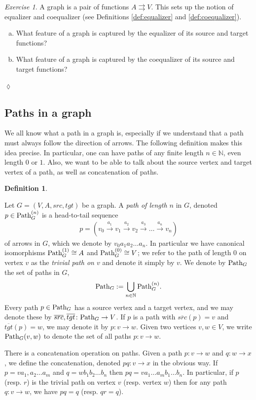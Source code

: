 \documentclass{book}
\def\tn{\textnormal}
\def\NN{{\mathbb N}}
\def\Path{\tn{Path}}
\def\to{\rightarrow}
\def\taking{\colon}
\def\tto{\rightrightarrows}
\def\iso{\cong}
\def\ol{\overline}
\newcommand{\To}[1]{\xrightarrow{#1}}
\theoremstyle{remark}
\newtheorem{exc}[subsubsection]{Exercise}
\newenvironment{exercise}{\begin{exc}}{\hspace*{\fill}$\lozenge$\end{exc}}
\theoremstyle{definition}
\newtheorem{definition}[subsubsection]{Definition}
\def\sexc{\begin{enumerate}[a.)]\setlength{\itemsep}{.1cm}\setlength{\parskip}{.1cm}\item}
\def\next{\item}
\def\endsexc{\end{enumerate}}
\begin{document}
\begin{exercise}\label{exc:(co)equalizer of graph}
A graph is a pair of functions $A\tto V$. This sets up the notion of equalizer and coequalizer (see Definitions \ref{def:equalizer} and \ref{def:coequalizer}). 
\sexc What feature of a graph is captured by the equalizer of its source and target functions? 
\next What feature of a graph is captured by the coequalizer of its source and target functions?
\endsexc
\end{exercise}


\subsection{Paths in a graph}\label{sec:paths in graph}

We all know what a path in a graph is, especially if we understand that a path must always follow the direction of arrows. The following definition makes this idea precise. In particular, one can have paths of any finite length $n\in\NN$, even length $0$ or $1$. Also, we want to be able to talk about the source vertex and target vertex of a path, as well as concatenation of paths.

\begin{definition}\label{def:paths in graph}

Let $G=(V,A,src,tgt)$ be a graph. A {\em path of length $n$} in $G$, denoted $p\in\Path_G^{(n)}$\index{a symbol!$\Path$} is a head-to-tail sequence \begin{align}\label{dia:path}p=(v_0\To{a_1}v_1\To{a_2}v_2\To{a_3}\ldots\To{a_n}v_n)\end{align} of arrows in $G$, which we denote by $v_0 a_1 a_2 \ldots a_n$. In particular we have canonical isomorphisms $\Path_G^{(1)}\iso A$ and $\Path_G^{(0)}\iso V$; we refer to the path of length 0 on vertex $v$ as the {\em trivial path on $v$} and denote it simply by $v$. We denote by $\Path_G$ the set of paths in $G$, $$\Path_G:=\bigcup_{n\in\NN}\Path_G^{(n)}.$$ Every path $p\in\Path_G$ has a source vertex and a target vertex, and we may denote these by $\ol{src},\ol{tgt}\taking\Path_G\to V$. If $p$ is a path with $\ol{src}(p)=v$ and $\ol{tgt}(p)=w$, we may denote it by $p\taking v\to w$. Given two vertices $v,w\in V$, we write $\Path_G(v,w)$ to denote the set of all paths $p\taking v\to w$.

There is a concatenation operation on paths. Given a path $p\taking v\to w$ and $q\taking w\to x$, we define the concatenation, denoted $p q\taking v\to x$ in the obvious way. If $p=va_1,a_2\ldots a_m$ and $q= wb_1b_2\ldots b_n$ then $pq=va_1\ldots a_mb_1\ldots b_n.$ In particular, if $p$ (resp. $r$) is the trivial path on vertex $v$ (resp. vertex $w$) then for any path $q\taking v\to w$, we have $pq=q$ (resp. $qr=q$). 

\end{definition}
\end{document}

